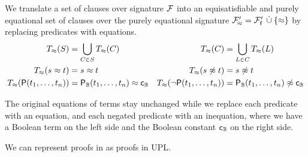     \begin{definition}
        We translate a set of clauses over signature \( \mathcal{F} \)
        into an equisatisfiable and purely equational set of clauses
        over the purely equational signature
        \( {\mathcal{F}'_{\!\approx}} = {\mathcal{F}'_{\mathsf{f}}}
        \, \mathbin{\dot\cup}  \{ \approx \} \)
        by replacing predicates with equations.
        \begin{align*}
            T_\approx(S) &= \bigcup_{C\in S} T_\approx(C) &
            T_\approx(C) &= \bigcup_{L\in C} T_\approx(L) \\
            T_\approx(s\approx t) &= s\approx t &
            T_\approx(s\not\approx t) &= s\not\approx t \\
            T_\approx(\mathsf{P}(t_1,\ldots,t_n)) &= {\mathsf{P}}_{\mathbb{B}}(t_1,\ldots,t_n)\approx{\mathsf{c}}_{\mathbb{B}} &
            T_\approx(\lnot\mathsf{P}(t_1,\ldots,t_n)) &= {\mathsf{P}}_{\mathbb{B}}(t_1,\ldots,t_n)\not\approx{\mathsf{c}}_{\mathbb{B}}
        \end{align*}
    \end{definition}

    The original equations of terms stay unchanged
    while we replace each predicate with an equation,
    and each negated predicate with an inequation,
    where we have a Boolean term on the left side
    and the Boolean constant \( {\mathsf{c}}_{\mathbb{B}} \) on the right side.



    \begin{corollary}
        We can represent proofs in \InstGenEQ{}
        as proofs in {UPL}.
    \end{corollary}

